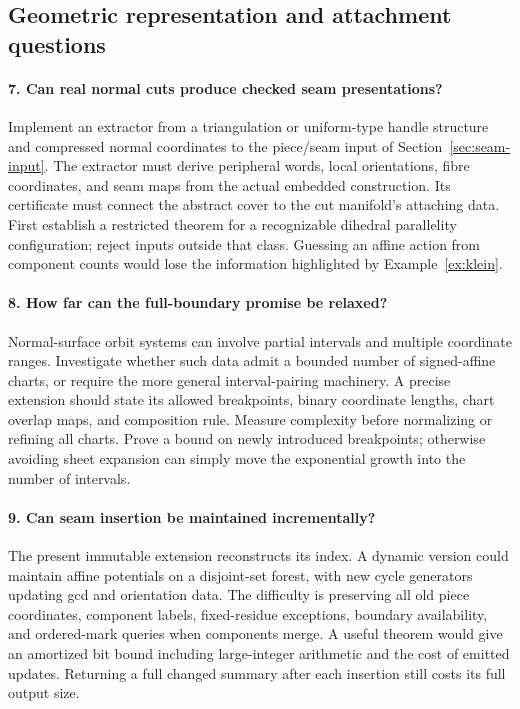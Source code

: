 \documentclass[11pt,a4paper]{article}
\theoremstyle{definition}\newtheorem{definition}[theorem]{Definition}
\theoremstyle{remark}\newtheorem{remark}[theorem]{Remark}
\begin{document}
\subsection{Geometric representation and attachment questions}

\paragraph{7. Can real normal cuts produce checked seam presentations?}
Implement an extractor from a triangulation or uniform-type handle
structure and compressed normal coordinates to the piece/seam input of
Section~\ref{sec:seam-input}. The extractor must derive peripheral words,
local orientations, fibre coordinates, and seam maps from the actual
embedded construction. Its certificate must connect the abstract cover to
the cut manifold's attaching data. First establish a restricted theorem
for a recognizable dihedral parallelity configuration; reject inputs
outside that class. Guessing an affine action from component counts would
lose the information highlighted by Example~\ref{ex:klein}.

\paragraph{8. How far can the full-boundary promise be relaxed?}
Normal-surface orbit systems can involve partial intervals and multiple
coordinate ranges. Investigate whether such data admit a bounded number
of signed-affine charts, or require the more general interval-pairing
machinery. A precise extension should state its allowed breakpoints,
binary coordinate lengths, chart overlap maps, and composition rule.
Measure complexity before normalizing or refining all charts. Prove a
bound on newly introduced breakpoints; otherwise avoiding sheet expansion
can simply move the exponential growth into the number of intervals.

\paragraph{9. Can seam insertion be maintained incrementally?}
The present immutable extension reconstructs its index. A dynamic version
could maintain affine potentials on a disjoint-set forest, with new cycle
generators updating gcd and orientation data. The difficulty is preserving
all old piece coordinates, component labels, fixed-residue exceptions,
boundary availability, and ordered-mark queries when components merge.
A useful theorem would give an amortized bit bound including large-integer
arithmetic and the cost of emitted updates. Returning a full changed
summary after each insertion still costs its full output size.
\end{document}
